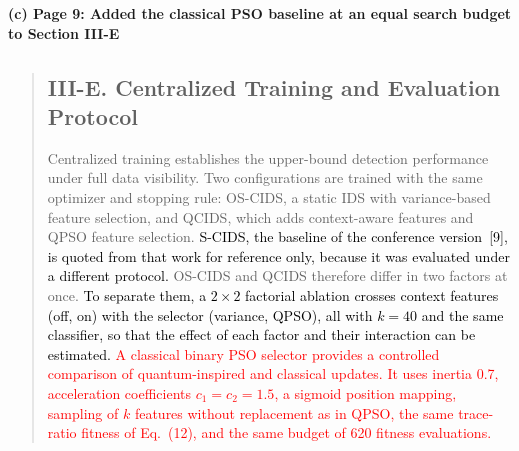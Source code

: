 \documentclass[11pt]{article}
\newenvironment{excerpt}{\begin{quote}\sloppy}{\end{quote}}
\newcommand{\mshead}[2]{\subsection*{\textbf{#1. #2}}}
\newcommand{\loc}[1]{\par\medskip\noindent\textbf{#1}\par}
\begin{document}
\loc{(c) Page 9: Added the classical PSO baseline at an equal search budget to Section III-E}
\begin{excerpt}
\mshead{III-E}{Centralized Training and Evaluation Protocol}


Centralized training establishes the upper-bound detection
performance under full data visibility. 
Two configurations are trained with the same optimizer and stopping
rule: OS-CIDS, a static IDS with variance-based feature selection,
and QCIDS, which adds context-aware features and QPSO feature
selection. \textcolor{black}{S-CIDS, the baseline of the conference
version~{[9]}, is quoted from that work for reference
only, because it was evaluated under a different protocol.}
OS-CIDS and QCIDS therefore differ in two factors at once.
\textcolor{black}{To separate them, a $2\times2$ factorial
ablation crosses context features (off, on) with the selector
(variance, QPSO), all with $k=40$ and the same classifier, so that the
effect of each factor and their interaction can be estimated. \textcolor{red}{A
classical binary PSO selector provides a controlled comparison of
quantum-inspired and classical updates. It uses inertia 0.7,
acceleration coefficients $c_1=c_2=1.5$, a sigmoid position mapping,
sampling of $k$ features without replacement as in QPSO, the same trace-ratio fitness of Eq.~(12), and the
same budget of 620 fitness evaluations.}}
\end{excerpt}
\end{document}
